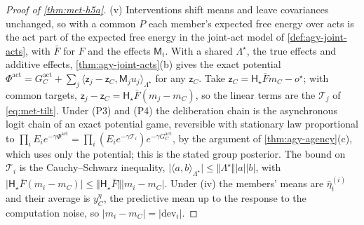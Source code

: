 \begin{proof}[Proof of \cref{thm:met-h5a}]
(v) Interventions shift means and leave covariances unchanged, so with a common $P$ each member's expected free energy over acts is the act part of the expected free energy in the joint-act model of \cref{def:agy-joint-acts}, with $\bar F$ for $F$ and the effects $\mathsf M_i$. With a shared $\Lambda^\star$, the true effects and additive effects, \cref{thm:agy-joint-acts}(b) gives the exact potential $\Phi^{\mathrm{act}}=G^{\mathrm{act}}_C+\sum_j\langle\mathsf z_j-\mathsf z_C,\mathsf M_ju_j\rangle_{\Lambda^\star}$ for any $\mathsf z_C$. Take $\mathsf z_C=\mathsf H_\star\bar Fm_C-o^\star$; with common targets, $\mathsf z_j-\mathsf z_C=\mathsf H_\star\bar F(m_j-m_C)$, so the linear terms are the $\mathcal T_j$ of \eqref{eq:met-tilt}. Under (P3) and (P4) the deliberation chain is the asynchronous logit chain of an exact potential game, reversible with stationary law proportional to $\prod_iE_ie^{-\gamma\Phi^{\mathrm{act}}}=\prod_i(E_ie^{-\gamma\mathcal T_i})e^{-\gamma G^{\mathrm{act}}_C}$, by the argument of \cref{thm:agy-agency}(c), which uses only the potential; this is the stated group posterior. The bound on $\mathcal T_i$ is the Cauchy--Schwarz inequality, $\lvert\langle a,b\rangle_{\Lambda^\star}\rvert\le\Vert\Lambda^\star\Vert\lvert a\rvert\lvert b\rvert$, with $\lvert\mathsf H_\star\bar F(m_i-m_C)\rvert\le\Vert\mathsf H_\star\bar F\Vert\lvert m_i-m_C\rvert$. Under (iv) the members' means are $\hat\eta^{(i)}_t$ and their average is $y^\eta_C$, the predictive mean up to the response to the computation noise, so $\lvert m_i-m_C\rvert=\lvert\mathrm{dev}_i\rvert$.
\end{proof}
